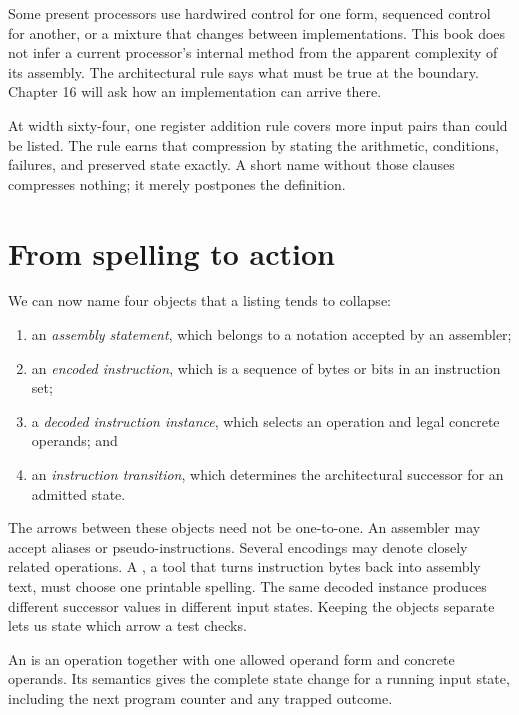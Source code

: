 Some present processors use hardwired control for one form, sequenced control
for another, or a mixture that changes between implementations. This book
does not infer a current processor's internal method from the apparent
complexity of its assembly. The architectural rule says what must be true at
the boundary. Chapter 16 will ask how an implementation can arrive there.

\begin{archive}[title={A short operation name can denote a vast table}]
At width sixty-four, one register addition rule covers more input pairs than
could be listed. The rule earns that compression by stating the arithmetic,
conditions, failures, and preserved state exactly. A short name without those
clauses compresses nothing; it merely postpones the definition.
\end{archive}

\section{From spelling to action}

We can now name four objects that a listing tends to collapse:

\begin{enumerate}
\item an \emph{assembly statement}, which belongs to a notation accepted by
an assembler;
\item an \emph{encoded instruction}, which is a sequence of bytes or bits in
an instruction set;
\item a \emph{decoded instruction instance}, which selects an operation and
legal concrete operands; and
\item an \emph{instruction transition}, which determines the architectural
successor for an admitted state.
\end{enumerate}

The arrows between these objects need not be one-to-one. An assembler may
accept aliases or pseudo-instructions. Several encodings may denote closely
related operations. A , a tool that turns instruction
bytes back into assembly text, must choose one printable spelling. The
same decoded instance produces different successor values in different input
states. Keeping the objects separate lets us state which arrow a test checks.

\begin{definition}[title={Instruction instance}]
An  is an operation together with one allowed
operand form and concrete operands. Its semantics gives the complete state
change for a running input state, including the next program counter and any
trapped outcome.
\end{definition}

